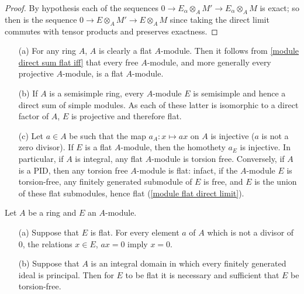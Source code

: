 \begin{proof}
By hypothesis each of the sequences $0\to E_\alpha\otimes_AM'\to E_\alpha\otimes_AM$ is exact; so then is the sequence $0\to E\otimes_AM'\to E\otimes_AM$ since taking the direct limit commutes with tensor products and preserves exactness.
\end{proof}
\begin{example}
\mbox{}
\begin{itemize}
\item[(a)] For any ring $A$, $A$ is clearly a flat $A$-module. Then it follows from \cref{module direct sum flat iff} that every free $A$-module, and more generally every projective $A$-module, is a flat $A$-module.
\item[(b)] If $A$ is a semisimple ring, every $A$-module $E$ is semisimple and hence a direct sum of simple modules. As each of these latter is isomorphic to a direct factor of $A$, $E$ is projective and therefore flat.
\item[(c)] Let $a\in A$ be such that the map $a_A:x\mapsto ax$ on $A$ is injective ($a$ is not a zero divisor). If $E$ is a flat $A$-module, then the homothety $a_E$ is injective. In particular, if $A$ is integral, any flat $A$-module is torsion free. Conversely, if $A$ is a PID, then any torsion free $A$-module is flat: infact, if the $A$-module $E$ is torsion-free, any finitely generated submodule of $E$ is free, and $E$ is the union of these flat submodules, hence flat (\cref{module flat direct limit}).
\end{itemize}
\end{example}
\begin{proposition}\label{module flat and torsion}
Let $A$ be a ring and $E$ an $A$-module.
\begin{itemize}
\item[(a)] Suppose that $E$ is flat. For every element $a$ of $A$ which is not a divisor of $0$, the relations $x\in E$, $ax=0$ imply $x=0$. 
\item[(b)] Suppose that $A$ is an integral domain in which every finitely generated ideal is principal. Then for $E$ to be flat it is necessary and sufficient that $E$ be torsion-free.
\end{itemize}
\end{proposition}
